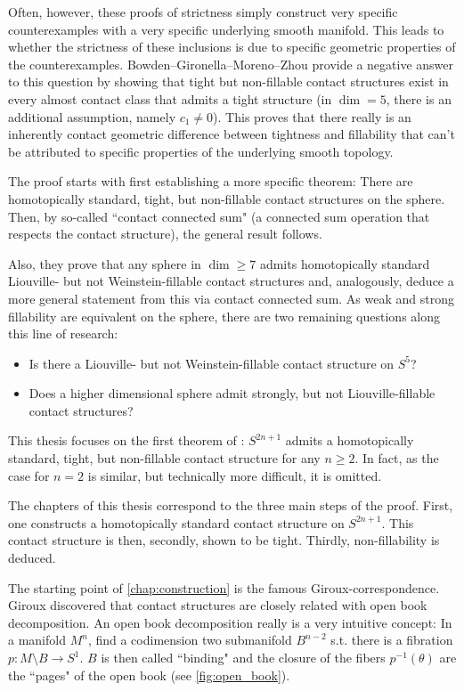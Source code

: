 Often, however, these proofs of strictness simply construct very specific counterexamples with a very specific underlying smooth manifold.
This leads to whether the strictness of these inclusions is due to specific geometric properties of the counterexamples.
Bowden--Gironella--Moreno--Zhou \cite{BGMZ22} provide a negative answer to this question by showing that tight but
non-fillable contact structures exist in every almost contact class that admits a tight structure (in $\dim = 5$, there is an additional assumption, namely $c_1\neq 0$).
This proves that there really is an inherently contact geometric difference between tightness and fillability
that can't be attributed to specific properties of the underlying smooth topology.

The proof starts with first establishing a more specific theorem: There are homotopically standard, tight, but non-fillable contact structures on the sphere.
Then, by so-called ``contact connected sum" (a connected sum operation that respects the contact structure),
the general result follows.

Also, they prove that any sphere in $\dim \geq 7$ admits homotopically standard Liouville- but not Weinstein-fillable contact structures
and, analogously, deduce a more general statement from this via contact connected sum.
As weak and strong fillability are equivalent on the sphere, there are two remaining questions along this line of research:
\begin{itemize}
    \item Is there a Liouville- but not Weinstein-fillable contact structure on $S^5$?
    \item Does a higher dimensional sphere admit strongly, but not Liouville-fillable contact structures?
\end{itemize}

This thesis focuses on the first theorem of \cite{BGMZ22}: $S^{2n+1}$ admits a homotopically standard, tight, but non-fillable contact structure
for any $n \geq 2$. In fact, as the case for $n = 2$ is similar, but technically more difficult, it is omitted.

The chapters of this thesis correspond to the three main steps of the proof. First, one constructs a homotopically standard contact structure on $S^{2n+1}$.
This contact structure is then, secondly, shown to be tight.
Thirdly, non-fillability is deduced.

The starting point of \cref{chap:construction} is the famous Giroux-correspondence.
Giroux discovered that contact structures are closely related with open book decomposition.
An open book decomposition really is a very intuitive concept: In a manifold $M^n$, find a codimension two submanifold $B^{n-2}$
s.t. there is a fibration $p\colon M\setminus B \to S^1$. $B$ is then called ``binding" and the closure of the fibers $p^{-1}(\theta)$ are the ``pages" of the open book 
(see \cref{fig:open_book}).


